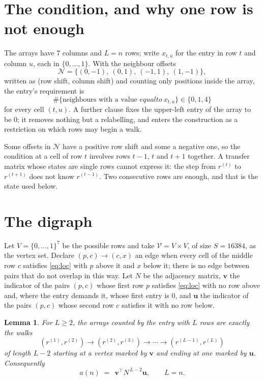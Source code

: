 \documentclass[11pt,a4paper]{article}
\theoremstyle{plain}
\newtheorem{lemma}[theorem]{Lemma}
\theoremstyle{definition}
\begin{document}
\section{The condition, and why one row is not enough}

The arrays have $7$ columns and $L=n$ rows; write $x_{t,u}$ for the entry in
row $t$ and column $u$, each in $\{0,\dots,1\}$. With the neighbour offsets
\[
\mathcal N=\{(0,-1),\ (0,1),\ (-1,1),\ (1,-1)\},
\]
written as (row shift, column shift) and counting only positions inside the array, the
entry's requirement is
\begin{equation}\label{eq:loc}
\#\{\text{neighbours with a value }equal to\ x_{t,u}\}\in\{0,1,4\}
\end{equation}
for every cell $(t,u)$. A further clause fixes the upper-left entry of the array to be $0$; it removes nothing but a relabelling, and enters the construction as a restriction on which rows may begin a walk.

Some offsets in $\mathcal N$ have a positive row shift and some a negative one, so the
condition at a cell of row $t$ involves rows $t-1$, $t$ and $t+1$ together. A transfer
matrix whose states are single rows cannot express it: the step from $r^{(t)}$ to
$r^{(t+1)}$ does not know $r^{(t-1)}$. Two consecutive rows are enough, and that is
the state used below.

\section{The digraph}

Let $V=\{0,\dots,1\}^{7}$ be the possible rows and take
$\mathcal V=V\times V$, of size $S=16384$, as the vertex set. Declare $(p,c)\to(c,x)$ an edge
when every cell of the middle row $c$ satisfies \eqref{eq:loc} with $p$ above it and $x$
below it; there is no edge between pairs that do not overlap in this way. Let $N$ be the
adjacency matrix, $\mathbf{v}$ the indicator of the pairs $(p,c)$ whose first row $p$
satisfies \eqref{eq:loc} with no row above and, where the entry demands it, whose first entry is $0$, and $\mathbf{u}$ the indicator of
the pairs $(p,c)$ whose second row $c$ satisfies it with no row below.

\begin{lemma}\label{lem:walk}
For $L\ge2$, the arrays counted by the entry with $L$ rows are exactly the walks
\[
(r^{(1)},r^{(2)})\to(r^{(2)},r^{(3)})\to\cdots\to(r^{(L-1)},r^{(L)})
\]
of length $L-2$ starting at a vertex marked by $\mathbf{v}$ and ending at one marked by
$\mathbf{u}$. Consequently
\[
a(n)\;=\;\,\mathbf{v}^{\!\top}N^{\,L-2}\mathbf{u},\qquad L=n .
\]
\end{lemma}
\end{document}
